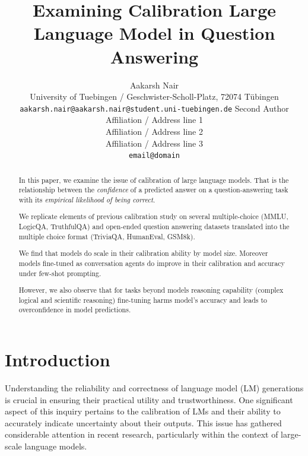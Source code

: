 \documentclass[11pt]{article}
\title{Examining Calibration Large Language Model in Question Answering}
\author{Aakarsh Nair\\
  University of Tuebingen / Geschwister-Scholl-Platz, 72074 Tübingen\\
  \texttt{aakarsh.nair@aakarsh.nair@student.uni-tuebingen.de} 
  Second Author \\
  Affiliation / Address line 1 \\
  Affiliation / Address line 2 \\
  Affiliation / Address line 3 \\
  \texttt{email@domain} \\}
\begin{document}
\maketitle


\begin{abstract}
In this paper, we examine the issue of calibration of 
large language models. 
That is the relationship between the \emph{confidence} 
of a predicted answer on a question-answering task 
with its \emph{empirical likelihood of being correct}.

We replicate elements of previous calibration study \cite{kadavath2022language} 
on several multiple-choice  (MMLU, LogicQA, TruthfulQA) and 
open-ended question answering datasets translated into 
the multiple choice format (TriviaQA, HumanEval, GSM8k). 

We find that models do scale in their calibration ability by model size. Moreover models fine-tuned as conversation agents do 
improve in their calibration and accuracy under 
few-shot prompting. 

However, we also observe that for tasks beyond models 
reasoning  capability (complex logical and scientific reasoning) 
fine-tuning harms model's accuracy and leads to 
overconfidence in model predictions.

\end{abstract}


\section{Introduction}


Understanding the reliability and correctness of language model (LM) generations is crucial in ensuring their practical utility and trustworthiness. One significant aspect of this inquiry pertains to the calibration of LMs and their ability to accurately indicate uncertainty about their outputs. This issue has gathered considerable attention in recent research, particularly within the context of large-scale language models.
\end{document}
